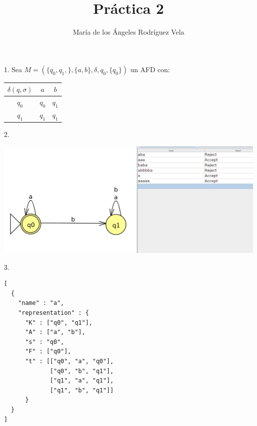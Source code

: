 \documentclass{article}
\title{Pr\'actica 2 }
\author{Mar\'ia de los \'Angeles Rodr\'iguez Vela}
\begin{document}
\maketitle

1. Sea $M=(\{q_0,q_1,\}, \{a,b\}, \delta, q_0, \{q_0\})$ un AFD con:\\

\begin{table}[h!]
\begin{tabular}{c|c|c}
  $\delta(q,\sigma)$ & $a$ & $b$\\
  \hline
  $q_0$& $q_0$ & $q_1$\\
  \hline
  $q_1$& $q_1$ & $q_1$\\
  
\end{tabular}
\end{table}







2.



\includegraphics[height=5 cm]{Ejercicio1P2.png}



3.


\begin{verbatim}
[
  {
    "name" : "a",
    "representation" : {
      "K" : ["q0", "q1"],
      "A" : ["a", "b"],
      "s" : "q0",
      "F" : ["q0"],
      "t" : [["q0", "a", "q0"],
             ["q0", "b", "q1"],
             ["q1", "a", "q1"],
             ["q1", "b", "q1"]]
      }
  }
]
\end{verbatim}
\end{document}
